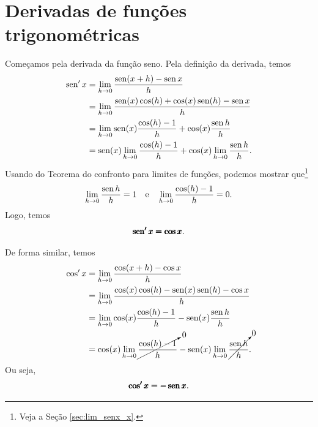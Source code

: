 

\section{Derivadas de funções trigonométricas}\label{cap_deriv_sec_trigo}

Começamos pela derivada da função seno. Pela definição da derivada, temos
\begin{align}
  \operatorname{sen}' x &= \lim_{h\to 0} \frac{\operatorname{sen}(x+h) - \operatorname{sen} x}{h} \\
            &= \lim_{h\to 0} \frac{\operatorname{sen}(x)\cos(h)+\cos(x)\operatorname{sen}(h) - \operatorname{sen} x}{h} \\
            &= \lim_{h\to 0} \operatorname{sen}(x)\frac{\cos(h) - 1}{h} + \cos(x)\frac{\operatorname{sen} h}{h}\\
            &= \operatorname{sen}(x) \lim_{h\to 0} \frac{\cos(h)-1}{h} + \cos(x)\lim_{h\to 0} \frac{\operatorname{sen} h}{h}.
\end{align}
Usando do Teorema do confronto para limites de funções, podemos mostrar que\footnote{Veja a Seção \ref{sec:lim_senx_x}.}
\begin{equation}
  \lim_{h\to 0} \frac{\operatorname{sen} h}{h} = 1\quad\text{e}\quad\lim_{h\to 0} \frac{\cos(h) - 1}{h} = 0.
\end{equation}
Logo, temos
\begin{equation}
  \pmb{\operatorname{sen}' x = \cos x}.
\end{equation}

De forma similar, temos
\begin{align}
  \cos' x &= \lim_{h\to 0} \frac{\cos(x+h) - \cos x}{h} \\
            &= \lim_{h\to 0} \frac{\cos(x)\cos(h)-\operatorname{sen}(x)\operatorname{sen}(h) - \cos x}{h} \\
            &= \lim_{h\to 0} \cos(x)\frac{\cos(h) - 1}{h} - \operatorname{sen}(x)\frac{\operatorname{sen} h}{h}\\
            &= \cos(x) \lim_{h\to 0} \cancelto{0}{\frac{\cos(h)-1}{h}} - \operatorname{sen}(x)\lim_{h\to 0} \cancelto{0}{\frac{\operatorname{sen} h}{h}}.
\end{align}
Ou seja,
\begin{equation}
  \pmb{\cos' x = -\operatorname{sen} x}.
\end{equation}

